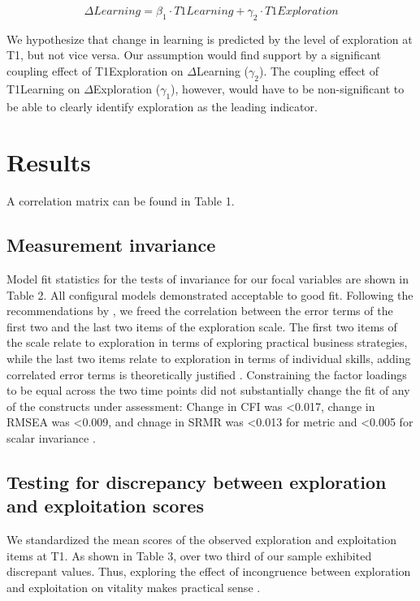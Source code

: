 \documentclass[man]{apa7}
\begin{document}
\[\Delta Learning=\beta_1 \cdot T1Learning + \gamma_2 \cdot T1Exploration\]

We hypothesize that change in learning is predicted by the level of exploration at T1, but not vice versa. 
Our assumption would find support by a significant coupling effect of T1Exploration on $\Delta$Learning ($\gamma_2$). 
The coupling effect of T1Learning on $\Delta$Exploration ($\gamma_1$), however, would have to be non-significant to be able to clearly identify exploration as the leading indicator. 

\section{Results}

A correlation matrix can be found in Table 1. 

\subsection{Measurement invariance}

Model fit statistics for the tests of invariance for our focal variables are shown in Table 2. 
All configural models demonstrated acceptable to good fit.
Following the recommendations by \textcite{Brown2015}, we freed the correlation between the error terms of the first two and the last two items of the exploration scale. 
The first two items of the scale relate to exploration in terms of exploring practical business strategies, while the last two items relate to exploration in terms of individual skills, adding correlated error terms is theoretically justified \parencite[e.g.,][]{Brown2015, Little.2013}. 
Constraining the factor loadings to be equal across the two time points did not substantially change the fit of any of the constructs under assessment: Change in CFI was <0.017, change in RMSEA was <0.009, and chnage in SRMR was <0.013 for metric and <0.005 for scalar invariance \parencite{Chen2007, Cheung2002}.

\subsection{Testing for discrepancy between exploration and exploitation scores}
We standardized the mean scores of the observed exploration and exploitation items at T1. 
As shown in Table 3, over two third of our sample exhibited discrepant values. 
Thus, exploring the effect of incongruence between exploration and exploitation on vitality makes practical sense \parencite{Shanock.2010b}.
\end{document}
